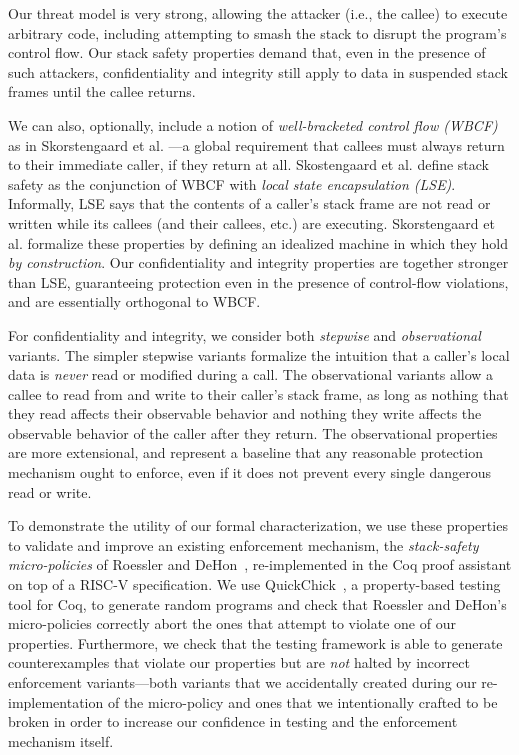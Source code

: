 \documentclass[10pt,conference]{ieeetran}%
\theoremstyle{definition}
\begin{document}
Our threat model is very strong, allowing the attacker (i.e., the
callee) to execute arbitrary code, including attempting to smash
the stack to disrupt the program’s control flow. Our stack safety
properties demand that, even in the presence of such attackers, confidentiality
and integrity still apply to data in suspended stack frames
until the callee returns.

We can also, optionally, include a notion of {\em well-bracketed control
flow (WBCF)} as in Skorstengaard et al. \cite{SkorstengaardSTKJFP}---a global requirement that
callees must always return to their immediate caller, if they return
at all. Skostengaard et al. define stack safety as the conjunction of WBCF with
{\em local state encapsulation (LSE)}.
Informally, LSE says that the contents of
a caller's stack frame are not read or written while its callees (and their callees, etc.) are
executing.
Skorstengaard et al. formalize these properties by defining an idealized
machine in which they hold {\em by construction}. Our confidentiality and
integrity properties are together stronger than LSE, guaranteeing protection even
in the presence of control-flow violations, and are essentially orthogonal to WBCF.

For confidentiality and integrity, we consider both {\em stepwise}
and {\em observational} variants.  The simpler stepwise
variants formalize the intuition that a caller's local data is {\em never}
read or modified during a call. The observational variants
allow a callee to read from and write to their caller's stack frame, as
long as nothing that they read affects their observable behavior and nothing
they write affects the observable behavior of the caller after they return.
The observational properties are more extensional, and represent a baseline
that any reasonable protection mechanism ought to enforce,
even if it does not prevent every single dangerous read or write.

To demonstrate the utility of our formal characterization, we use these
properties to validate and improve an existing enforcement mechanism, the
{\em stack-safety micro-policies} of Roessler and DeHon~\cite{DBLP:conf/sp/RoesslerD18}, re-implemented
in the Coq proof assistant on top of a RISC-V specification.  We
use QuickChick~\cite{Denes:VSL2014,Pierce:SF4}, a property-based testing
tool for Coq, to generate random programs and check
that Roessler and DeHon's micro-policies correctly abort the ones that
attempt to violate one of our properties. Furthermore, we
%
check that the testing framework is able to generate counterexamples
that violate our properties but are \emph{not} halted by incorrect
enforcement variants---both variants that we accidentally created
during our re-implementation of the micro-policy and ones that we
intentionally crafted to be broken in order to increase our confidence
in testing and the enforcement mechanism itself.
\end{document}
